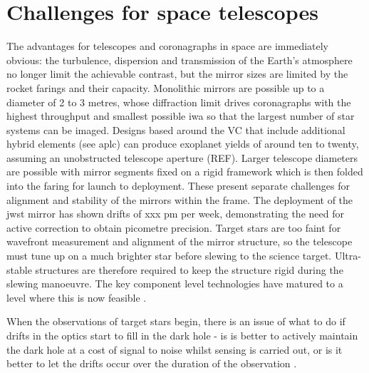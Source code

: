 \documentclass[letterpaper]{ar-1col}
\begin{document}

\section{Challenges for space telescopes}

The advantages for telescopes and coronagraphs in space are immediately obvious: the turbulence, dispersion and transmission of the Earth's atmosphere no longer limit the achievable contrast, but the mirror sizes are limited by the rocket farings and their capacity.
%
Monolithic mirrors are possible up to a diameter of 2 to 3 metres, whose diffraction limit drives coronagraphs with the highest throughput and smallest possible \ac{iwa} so that the largest number of star systems can be imaged.
%
Designs based around the VC that include additional hybrid elements (see \ac{aplc}) can produce exoplanet yields of around ten to twenty, assuming an unobstructed telescope aperture (REF).
%
Larger telescope diameters are possible with mirror segments fixed on a rigid framework which is then folded into the faring for launch to deployment.
%
These present separate challenges for alignment and stability of the mirrors within the frame.
%
The deployment of the \ac{jwst} mirror has shown drifts of xxx pm per week, demonstrating the need for active correction to obtain picometre precision.
%
Target stars are too faint for wavefront measurement and alignment of the mirror structure, so the telescope must tune up on a much brighter star before slewing to the science target.
%
Ultra-stable structures are therefore required to keep the structure rigid during the slewing manoeuvre.
%
The key component level technologies have matured to a level where this is now feasible \citep{Coyle21}.

When the observations of target stars begin, there is an issue of what to do if drifts in the optics start to fill in the dark hole - is is better to actively maintain the dark hole at a cost of signal to noise whilst sensing is carried out, or is it better to let the drifts occur over the duration of the observation \citep{Pogorelyuk19,Redmond20}.





\end{document}
